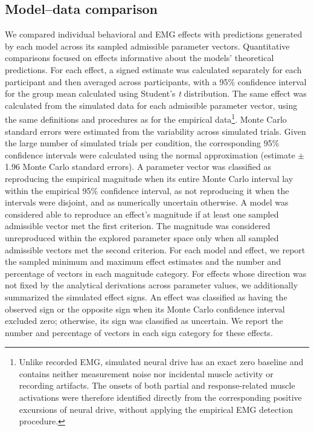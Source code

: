 \documentclass[a4paper,11pt]{article}
\theoremstyle{definition}
\newcommand{\1}{\mathbbm{1}}
\begin{document}
\subsection{Model--data comparison}

We compared individual behavioral and EMG effects with predictions generated by each model across its sampled admissible parameter vectors. Quantitative comparisons focused on effects informative about the models' theoretical predictions. For each effect, a signed estimate was calculated separately for each participant and then averaged across participants, with a 95\% confidence interval for the group mean calculated using Student's \emph{t} distribution. The same effect was calculated from the simulated data for each admissible parameter vector, using the same definitions and procedures as for the empirical data\footnote{Unlike recorded EMG, simulated neural drive has an exact zero baseline and contains neither measurement noise nor incidental muscle activity or recording artifacts. The onsets of both partial and response-related muscle activations were therefore identified directly from the corresponding positive excursions of neural drive, without applying the empirical EMG detection procedure.}. Monte Carlo standard errors were estimated from the variability across simulated trials. Given the large number of simulated trials per condition, the corresponding 95\% confidence intervals were calculated using the normal approximation (estimate $\pm$ 1.96 Monte Carlo standard errors). A parameter vector was classified as reproducing the empirical magnitude when its entire Monte Carlo interval lay within the empirical 95\% confidence interval, as not reproducing it when the intervals were disjoint, and as numerically uncertain otherwise. A model was considered able to reproduce an effect's magnitude if at least one sampled admissible vector met the first criterion. The magnitude was considered unreproduced within the explored parameter space only when all sampled admissible vectors met the second criterion. For each model and effect, we report the sampled minimum and maximum effect estimates and the number and percentage of vectors in each magnitude category. For effects whose direction was not fixed by the analytical derivations across parameter values, we additionally summarized the simulated effect signs. An effect was classified as having the observed sign or the opposite sign when its Monte Carlo confidence interval excluded zero; otherwise, its sign was classified as uncertain. We report the number and percentage of vectors in each sign category for these effects.
\end{document}
